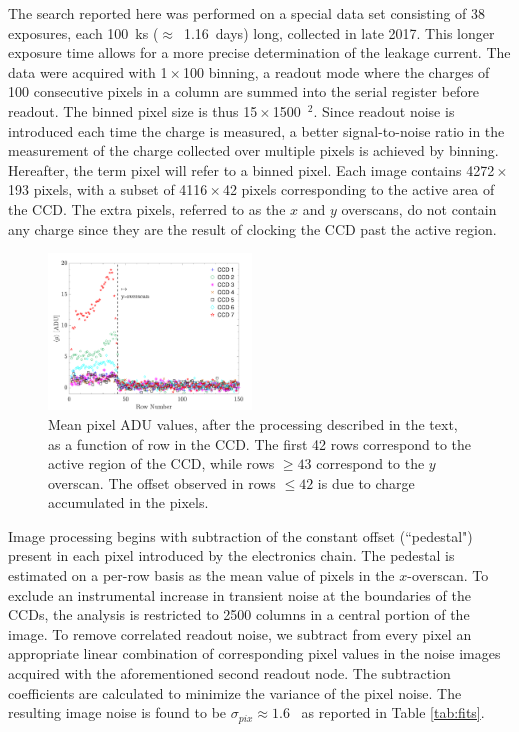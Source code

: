 \documentclass[aps,amsmath,amssymb,twocolumn,superscriptaddress,nofootinbib]{revtex4-1}
\begin{document}
The  search reported here was performed on a special data set consisting of 38 exposures, each 100~ks ($\approx$~1.16~days) long, collected in late 2017. This longer exposure time allows for a more precise determination of the leakage current. The data were acquired with 1\,$\times$\,100 binning, a readout mode where the charges of 100 consecutive pixels in a column are summed into the serial register before readout. The binned pixel size is thus 15\,$\times $\,1500~\um$^2$. Since readout noise is introduced each time the charge is measured, a better signal-to-noise ratio in the measurement of the charge collected over multiple pixels is achieved by binning. Hereafter, the term pixel will refer to a binned pixel. Each image contains 4272\,$\times$\,193 pixels, with a subset of 4116\,$\times$\,42 pixels corresponding to the active area of the CCD. The extra pixels, referred to as the $x$ and $y$ overscans, do not contain any charge since they are the result of clocking the CCD past the active region.
\begin{figure}[t!]
	\centering
	\includegraphics[width=0.48\textwidth]{Ext212.pdf}
	\caption{Mean pixel ADU values, after the processing described in the text, as a function of row in the CCD. The first 42 rows correspond to the active region of the CCD, while rows $\ge 43$ correspond to the $y$ overscan. The offset observed in rows $\le42$ is due to charge accumulated in the pixels.}
	\label{fig:ext212}
\end{figure}

Image processing begins with subtraction of the constant offset (``pedestal") present in each pixel introduced by the electronics chain. The pedestal is estimated on a per-row basis as the mean value of pixels in the $x$-overscan. To exclude an instrumental increase in transient noise at the boundaries of the CCDs, the analysis is restricted to 2500 columns in a central portion of the image. To remove correlated readout noise, we subtract from every pixel an appropriate linear combination of corresponding pixel values in the noise images acquired with the aforementioned second readout node. The subtraction coefficients are calculated to minimize the variance of the pixel noise. The resulting image noise is found to be $ \sigma_{pix} \approx 1.6$ \electron\ as reported in Table \ref{tab:fits}. 
\end{document}
